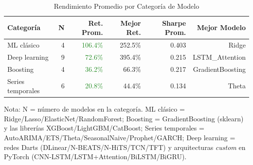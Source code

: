 \begin{table}[htbp]
\centering
\caption{Rendimiento Promedio por Categor\'ia de Modelo}
\label{tab:category_comparison}
\begin{tabular}{@{}lrrrrr@{}}
\toprule
\textbf{Categor\'ia} & \textbf{N} & \textbf{Ret. Prom.} & \textbf{Mejor Ret.} & \textbf{Sharpe Prom.} & \textbf{Mejor Modelo} \\
\midrule
ML cl\'asico & 4 & \textcolor{ForestGreen}{106.4\%} & 252.5\% & 0.403 & Ridge \\
Deep learning & 9 & \textcolor{ForestGreen}{72.6\%} & 395.4\% & 0.215 & LSTM\_Attention \\
Boosting & 4 & \textcolor{ForestGreen}{36.2\%} & 66.3\% & 0.217 & GradientBoosting \\
Series temporales & 6 & \textcolor{ForestGreen}{20.8\%} & 44.4\% & 0.134 & Theta \\
\bottomrule
\end{tabular}
\begin{tablenotes}
\small
\item Nota: N = n\'umero de modelos en la categor\'ia. ML cl\'asico = Ridge/Lasso/ElasticNet/RandomForest; Boosting = GradientBoosting (sklearn) y las librer\'ias XGBoost/LightGBM/CatBoost; Series temporales = AutoARIMA/ETS/Theta/SeasonalNaive/Prophet/GARCH; Deep learning = redes Darts (DLinear/N-BEATS/N-HiTS/TCN/TFT) y arquitecturas \textit{custom} en PyTorch (CNN-LSTM/LSTM+Attention/BiLSTM/BiGRU).
\end{tablenotes}
\end{table}
